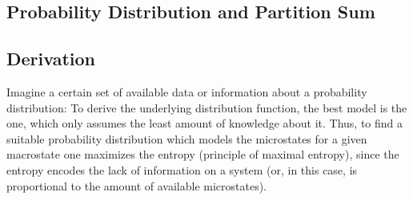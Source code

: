 \documentclass[a4paper,10pt]{article}
\numberwithin{equation}{section}
\begin{document}
\begin{multicols}{2}
\section{Probability Distribution and Partition Sum}

\subsection{Derivation}
Imagine a certain set of available data or information about a probability distribution:
To derive the underlying distribution function, the best model is the one, which only assumes the least amount of knowledge about it.
Thus, to find a suitable probability distribution which models the microstates for a given macrostate one maximizes the entropy (principle of maximal entropy), since the entropy encodes the lack of information on a system (or, in this case, is proportional to the amount of available microstates).


\end{multicols}
\end{document}
